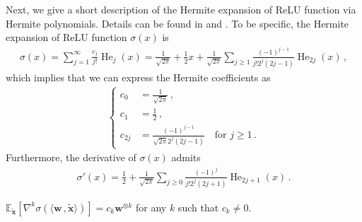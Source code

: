 Next, we give a short description of the Hermite expansion of ReLU function via Hermite polynomials. Details can be found in \citet[A.1.1]{damian2022neural} and \cite{arous2021online}.
To be specific, the Hermite expansion of ReLU function $\sigma(x)$ is
\begin{align}
\label{Hermite-sigma}
    \sigma(x)=\sum_{j=1}^\infty \frac{c_j}{j!}\operatorname{He}_j(x) =\frac{1}{\sqrt{2\pi}}+\frac{1}{2}x+\frac{1}{\sqrt{2\pi}}\sum_{j\geq 1}\frac{(-1)^{j-1}}{j!2^j(2j-1)}\operatorname{He}_{2j}(x)\,,
\end{align}
which implies that we can express the Hermite coefficients as
\begin{align}
\label{Hermite-coef}
    \left\{\begin{aligned}
        c_0 & = \frac{1}{\sqrt{2\pi}}\,,\\
        c_1 & = \frac{1}{2}\,,\\
        c_{2j} & = \frac{(-1)^{j-1}}{\sqrt{2\pi}2^j(2j-1)}\quad \text{for }j\geq 1\,.
    \end{aligned}\right.
\end{align}
Furthermore, the derivative of $\sigma(x)$ admits
\begin{align}
\label{Hermite-sigma'}
    \sigma'(x)=\frac{1}{2}+\frac{1}{\sqrt{2\pi}}\sum_{j\geq 0}\frac{(-1)^{j}}{j!2^j(2j+1)}\operatorname{He}_{2j+1}(x)\,.
\end{align}

\begin{lemma}\citep[Corollary 9]{oko2024pretrained}\label{differential}
$\mathbb{E}_{\widetilde{\bm x}}[\nabla^k \sigma(\langle \bm w\,, \widetilde{\bm x}\rangle)] = c_k \bm w^{\otimes k}$ for any $k$ such that $c_k\neq 0$.
\end{lemma}

